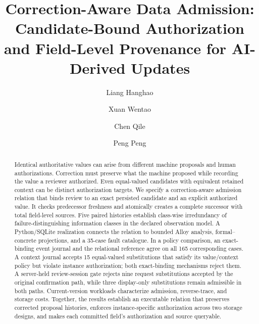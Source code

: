 \documentclass[smallcondensed,natbib,nospthms]{svjour3}
\begin{document}
\title{Correction-Aware Data Admission: Candidate-Bound Authorization and Field-Level Provenance for AI-Derived Updates}
\author{Liang Hanghao \and Xuan Wentao \and Chen Qile \and Peng Peng}
\date{}
\maketitle
\begin{abstract}
Identical authoritative values can arise from different machine proposals and human authorizations. Correction must preserve what the machine proposed while recording the value a reviewer authorized. Even equal-valued candidates with equivalent retained context can be distinct authorization targets. We specify a correction-aware admission relation that binds review to an exact persisted candidate and an explicit authorized value. It checks predecessor freshness and atomically creates a complete successor with total field-level sources. Five paired histories establish class-wise irredundancy of failure-distinguishing information classes in the declared observation model. A Python/SQLite realization connects the relation to bounded Alloy analysis, formal--concrete projections, and a 35-case fault catalogue. In a policy comparison, an exact-binding event journal and the relational reference agree on all 165 corresponding cases. A context journal accepts 15 equal-valued substitutions that satisfy its value/context policy but violate instance authorization; both exact-binding mechanisms reject them. A server-held review-session gate rejects nine request substitutions accepted by the original confirmation path, while three display-only substitutions remain admissible in both paths. Current-version workloads characterize admission, reverse-trace, and storage costs. Together, the results establish an executable relation that preserves corrected proposal histories, enforces instance-specific authorization across two storage designs, and makes each committed field's authorization and source queryable.
\end{abstract}
















\end{document}
